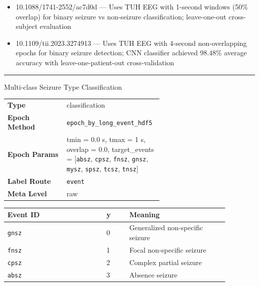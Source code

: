 {\begin{tcolorbox}
\begin{tabular}{@{}p{0.3911\linewidth}p{0.0978\linewidth}p{0.3911\linewidth}@{}}
\bottomrule
\end{tabular}
\endgroup
\par{}\par
\begin{itemize}[leftmargin=1.3em,noitemsep,topsep=1pt]
\item[\scriptsize$\cdot$] {\scriptsize 10.1088/1741-2552/ac7d0d --- Uses TUH EEG with 1-second windows (50\% overlap) for binary seizure vs non-seizure classification; leave-one-out cross-subject evaluation}
\item[\scriptsize$\cdot$] {\scriptsize 10.1109/tii.2023.3274913 --- Uses TUH EEG with 4-second non-overlapping epochs for binary seizure detection; CNN classifier achieved 98.48\% average accuracy with leave-one-patient-out cross-validation}
\end{itemize}
\noindent\rule{\linewidth}{0.4pt}\par\nopagebreak
{} {\footnotesize Multi-class Seizure Type Classification}\par\smallskip
{\footnotesize\begin{tabular}{@{}lp{0.62\linewidth}@{}}
\textbf{Type} & classification \\
\textbf{Epoch Method} & \texttt{epoch\_by\_long\_event\_hdf5} \\
\textbf{Epoch Params} & tmin = 0.0 s, tmax = 1 s, overlap = 0.0, target\_events = [\texttt{absz}, \texttt{cpsz}, \texttt{fnsz}, \texttt{gnsz}, \texttt{mysz}, \texttt{spsz}, \texttt{tcsz}, \texttt{tnsz}] \\
\textbf{Label Route} & \texttt{event} \\
\textbf{Meta Level} & raw \\
\end{tabular}}
\par{}\par\smallskip
\begingroup\footnotesize
\begin{tabular}{@{}p{0.3911\linewidth}p{0.0978\linewidth}p{0.3911\linewidth}@{}}
\toprule
\textbf{Event ID} & \textbf{y} & \textbf{Meaning} \\
\midrule
\texttt{gnsz} & 0 & Generalized non-specific seizure \\
\texttt{fnsz} & 1 & Focal non-specific seizure \\
\texttt{cpsz} & 2 & Complex partial seizure \\
\texttt{absz} & 3 & Absence seizure \\

\end{tabular}
\end{tcolorbox}}
